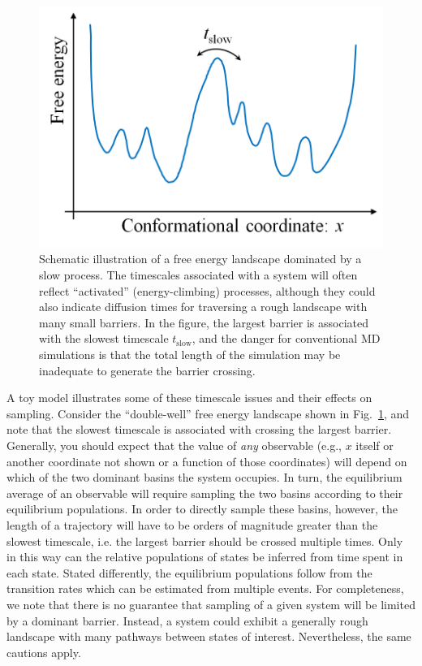 \begin{figure}
  \centering
  \includegraphics[width=0.9\linewidth]{figures/1d-landscape-tslow}
  \caption{
  \label{fig:landscape} 
  Schematic illustration of a free energy landscape dominated by a slow process.
  The timescales associated with a system will often reflect ``activated'' (energy-climbing) processes, although they could also indicate diffusion times for traversing a rough landscape with many small barriers.
  In the figure, the largest barrier is associated with the slowest timescale $t_{\mathrm{slow}}$, and the danger for conventional MD simulations is that the total length of the simulation may be inadequate to generate the barrier crossing.
  }
\end{figure}

A toy model illustrates some of these timescale issues and their effects on sampling.
Consider the ``double-well'' free energy landscape shown in Fig.\ \ref{fig:landscape}, and note that the slowest timescale is associated with crossing the largest barrier.  Generally, you should expect that the value of \emph{any} observable (e.g., $x$ itself or another coordinate not shown or a function of those coordinates) will depend on which of the two dominant basins the system occupies.  In turn, the equilibrium average of an observable will require sampling the two basins according to their equilibrium populations.  In order to directly sample these basins, however, the length of a trajectory will have to be orders of magnitude greater than the slowest timescale, i.e. the largest barrier should be crossed multiple times.  Only in this way can the relative populations of states be inferred from time spent in each state.  Stated differently, the equilibrium populations follow from the transition rates \cite{Zuckerman2011,Chou11,Kolmogoroff1936} which can be estimated from multiple events.  For completeness, we note that there is no guarantee that sampling of a given system will be limited by a dominant barrier.  Instead, a system could exhibit a generally rough landscape with many pathways between states of interest.
Nevertheless, the same cautions apply.

